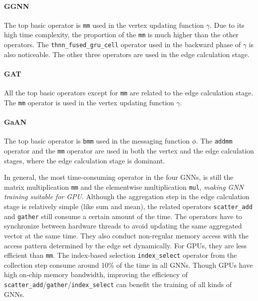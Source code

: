 \paragraph{GGNN}
The top basic operator is \texttt{mm} used in the vertex updating function $\gamma$.
Due to its high time complexity, the proportion of the \texttt{mm} is much higher than the other operators.
The \texttt{thnn\_fused\_gru\_cell} operator used in the backward phase of $\gamma$ is also noticeable.
The other three operators are used in the edge calculation stage.

\paragraph{GAT}
All the top basic operators except for \texttt{mm} are related to the edge calculation stage.
The \texttt{mm} operator is used in the vertex updating function $\gamma$.

\paragraph{GaAN}
The top basic operator is \texttt{bmm} used in the messaging function $\phi$.
The \texttt{addmm} operator and the \texttt{mm} operator are used in both the vertex and the edge calculation stages, where the edge calculation stage is dominant.

In general, the most time-consuming operator in the four GNNs, is still the matrix multiplication \texttt{mm} and the elementwise multiplication \texttt{mul}, \emph{making GNN training suitable for GPU}.
Although the aggregation step in the edge calculation stage is relatively simple (like sum and mean), the related operators \texttt{scatter\_add} and \texttt{gather} still consume a certain amount of the time.
The operators have to synchronize between hardware threads to avoid updating the same aggregated vector at the same time. They also conduct non-regular memory access with the access pattern determined by the edge set dynamically.
For GPUs, they are less efficient than \texttt{mm}.
The index-based selection \texttt{index\_select} operator from the collection step consume around 10\% of the time in all GNNs.
Though GPUs have high on-chip memory bandwidth, improving the efficiency of \texttt{scatter\_add}/\texttt{gather}/\texttt{index\_select} can benefit the training of all kinds of GNNs.

